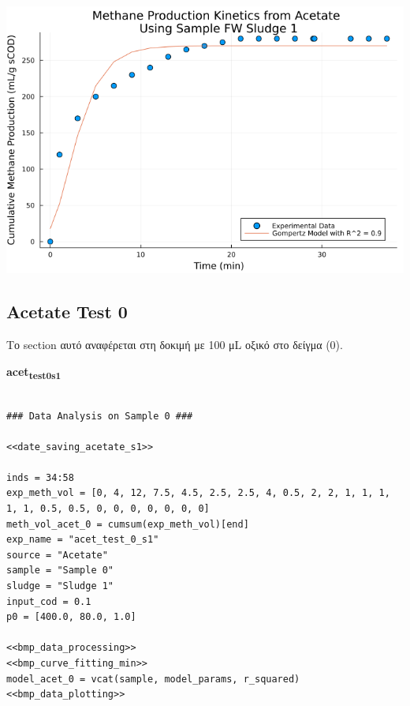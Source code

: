 \documentclass[11pt]{article}
\begin{document}
\begin{center}
\includegraphics[width=.9\linewidth]{../plots/BMPs/Acetate/methane_kinetics_acet_test_fw_s1.png}
\end{center}

\subsection{Acetate Test 0}
\label{sec:org14c18f5}
Το section αυτό αναφέρεται στη δοκιμή με 100 μL οξικό στο δείγμα (0).

\textbf{acet\textsubscript{test}\textsubscript{0}\textsubscript{s1}}
\begin{verbatim}

### Data Analysis on Sample 0 ###

<<date_saving_acetate_s1>>

inds = 34:58
exp_meth_vol = [0, 4, 12, 7.5, 4.5, 2.5, 2.5, 4, 0.5, 2, 2, 1, 1, 1, 1, 1, 0.5, 0.5, 0, 0, 0, 0, 0, 0, 0]
meth_vol_acet_0 = cumsum(exp_meth_vol)[end]
exp_name = "acet_test_0_s1"
source = "Acetate"
sample = "Sample 0"
sludge = "Sludge 1"
input_cod = 0.1
p0 = [400.0, 80.0, 1.0]

<<bmp_data_processing>>
<<bmp_curve_fitting_min>>
model_acet_0 = vcat(sample, model_params, r_squared)
<<bmp_data_plotting>>
\end{verbatim}
\end{document}
